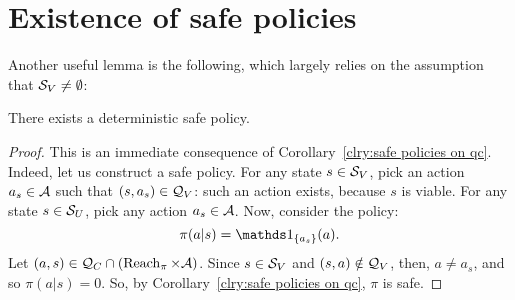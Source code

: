 \section{Existence of safe policies}
Another useful lemma is the following, which largely relies on the assumption that ${\mathcal{S}_{V}}\neq\emptyset$:
\begin{lemma}
	There exists a deterministic safe policy.
	\label{lemma:safe policy}
\end{lemma}
\begin{proof}
	This is an immediate consequence of Corollary~\ref{clry:safe policies on qc}. Indeed, let us construct a safe policy. For any state $s\in{\ensuremath{\mathcal{S}}_{V}}$, pick an action $a_s\in\mathcal{A}$ such that $(s, a_s)\in\mathcal{Q}_{V}$: such an action exists, because $s$ is viable. For any state $s\in{\ensuremath{\mathcal{S}}_{U}}$, pick any action $a_s\in\mathcal{A}$. Now, consider the policy:
	$$
		\pi(a|s) = \indicator_{\{a_s\}}(a).
	$$
	Let $(a, s)\in\mathcal{Q}_{C}\cap(\operatorname{Reach}_\pi\times\mathcal{A})$. Since $s\in{\ensuremath{\mathcal{S}}_{V}}$ and $(s, a)\notin\mathcal{Q}_{V}$, then, $a\neq a_s$, and so $\pi(a|s) = 0$. So, by Corollary~\ref{clry:safe policies on qc}, $\pi$ is safe.
\end{proof}

